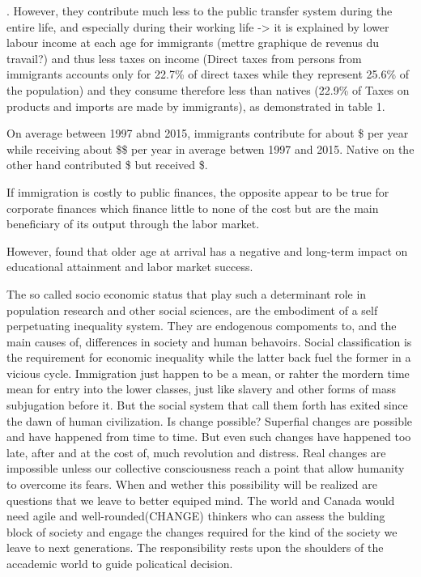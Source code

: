 .
However, they contribute much less to the public transfer system during the entire life, and especially during their working life -> it is explained by lower labour income at each age for immigrants (mettre graphique de revenus du travail?) and thus less taxes on income (Direct taxes from persons from immigrants accounts only for 22.7\% of direct taxes while they represent 25.6\% of the population) and they consume therefore less than natives (22.9\% of Taxes on products and imports are made by immigrants), as demonstrated in table 1.

On average between 1997 abnd 2015, immigrants contribute for about \$ per year while receiving about \$\$ per year in average betwen 1997 and 2015. Native on the other hand contributed \$ but received \$.

If immigration is costly to public finances, the opposite appear to be true for corporate finances which finance little to none of the cost but are the main beneficiary of its output through the labor market.




However, \citet{Hermansen:2017ht} found that older age at arrival has a negative and long-term impact on educational attainment and labor market success.

\vspace{0.7em}\par
The so called socio economic status that play such a determinant role in population research and other social sciences, are the embodiment of a self perpetuating inequality system. They are endogenous compoments to, and the main causes of, differences in society and human behavoirs. Social classification is the requirement for economic inequality while the latter back fuel the former in a vicious cycle. Immigration just happen to be a mean, or rahter the mordern time mean for entry into the lower classes, just like slavery and other forms of mass subjugation before it. But the social system that call them forth has exited since the dawn of human civilization. Is change possible? Superfial changes are possible and have happened from time to time. But even such changes have happened too late, after and at the cost of, much revolution and distress. Real changes are impossible unless our collective consciousness reach a point that allow humanity to overcome its fears. When and wether this possibility will be realized are questions that we leave to better equiped mind. The world and Canada would need agile and well-rounded(CHANGE) thinkers who can assess the bulding block of society and engage the changes required for the kind of the society we leave to next generations. The responsibility rests upon the shoulders of the accademic world to guide policatical decision.






